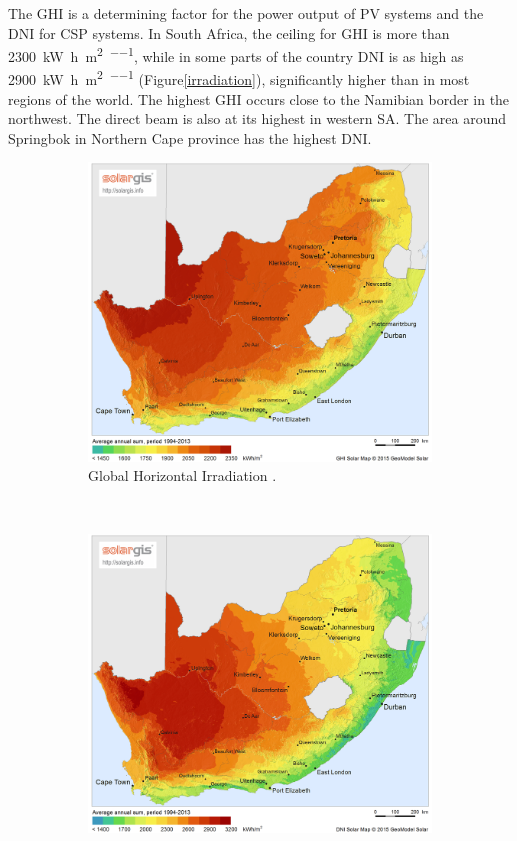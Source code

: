 The GHI is a determining factor for the power output of PV systems and the DNI for CSP systems. In South Africa, the ceiling for GHI is more than \SI{2300}{\kilo\watt\hour\per\square\metre\per\year}, while in some parts of the country DNI is as high as \SI{2900}{\kilo\watt\hour\per\square\metre\per\year} (Figure\ref{irradiation}), significantly higher than in most regions of the world. The highest GHI occurs close to the Namibian border in the northwest. The direct beam is also at its highest in western SA. The area around Springbok in Northern Cape province has the highest DNI.

\begin{figure}[h!]
        \centering
        \begin{subfigure}[b]{0.5\textwidth}
                \centering
                \includegraphics[width=1\textwidth]{FIG/SA_GHI}
                \caption{Global Horizontal Irradiation \cite{SolarGIS2015a}.}\label{fig:bild-links}
        \end{subfigure}%
        ~
        \begin{subfigure}[b]{0.5\textwidth}
                \centering
                \includegraphics[width=1\textwidth]{FIG/SA_DNI}

\end{subfigure}
\end{figure}
